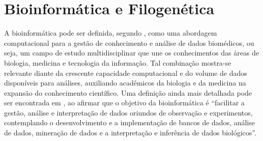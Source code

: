 \documentclass[english,brazilian]{UNISINOSmonografia} %
\begin{document}
\section{Bioinformática e Filogenética}
\label{sec:bioinformatica}


A bioinformática pode ser definida, segundo , como uma abordagem computacional para a gestão de conhecimento e análise de dados biomédicos, ou seja, um campo de estudo multidisciplinar que une os conhecimentos das áreas de biologia, medicina e tecnologia da informação.
Tal combinação mostra-se relevante diante da crescente capacidade computacional e do volume de dados disponíveis para análises, auxiliando acadêmicos da biologia e da medicina na expansão do conhecimento científico.
Uma definição ainda mais detalhada pode ser encontrada em , ao afirmar que o objetivo da bioinformática é ``facilitar a gestão, análise e interpretação de dados oriundos de observação e experimentos, contemplando o desenvolvimento e a implementação de bancos de dados, análise de dados, mineração de dados e a interpretação e inferência de dados biológicos''.


%
%
\end{document}
